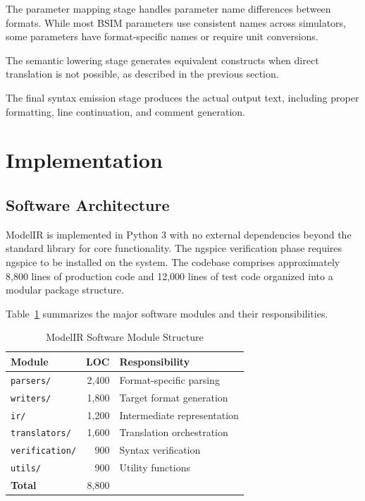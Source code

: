 \documentclass[conference]{IEEEtran}
\begin{document}
The parameter mapping stage handles parameter name differences between formats. While most BSIM parameters use consistent names across simulators, some parameters have format-specific names or require unit conversions.

The semantic lowering stage generates equivalent constructs when direct translation is not possible, as described in the previous section.

The final syntax emission stage produces the actual output text, including proper formatting, line continuation, and comment generation.

\section{Implementation}

\subsection{Software Architecture}

ModelIR is implemented in Python 3 with no external dependencies beyond the standard library for core functionality. The ngspice verification phase requires ngspice to be installed on the system. The codebase comprises approximately 8,800 lines of production code and 12,000 lines of test code organized into a modular package structure.

Table~\ref{tab:modules} summarizes the major software modules and their responsibilities.

\begin{table}[htbp]
\caption{ModelIR Software Module Structure}
\label{tab:modules}
\centering
\begin{tabular}{lrl}
\toprule
\textbf{Module} & \textbf{LOC} & \textbf{Responsibility} \\
\midrule
\texttt{parsers/} & 2,400 & Format-specific parsing \\
\texttt{writers/} & 1,800 & Target format generation \\
\texttt{ir/} & 1,200 & Intermediate representation \\
\texttt{translators/} & 1,600 & Translation orchestration \\
\texttt{verification/} & 900 & Syntax verification \\
\texttt{utils/} & 900 & Utility functions \\
\midrule
\textbf{Total} & 8,800 & \\
\bottomrule
\end{tabular}
\end{table}
\end{document}
